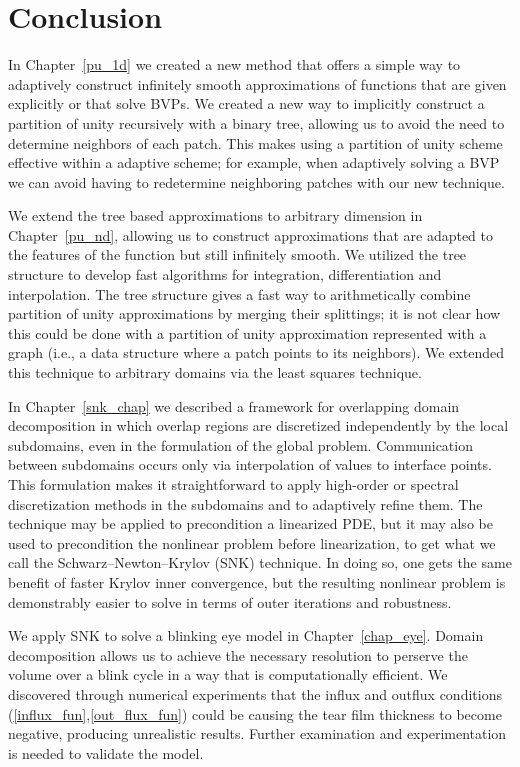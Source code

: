\chapter{Conclusion}

In Chapter~\ref{pu_1d} we created a new method that offers a simple way to adaptively construct infinitely smooth approximations of functions that are given explicitly or that solve BVPs. We created a new way to implicitly construct a partition of unity recursively with a binary tree, allowing us to avoid the need to determine neighbors of each patch. This makes using a partition of unity scheme effective within a adaptive scheme; for example, when adaptively solving a BVP we can avoid having to redetermine neighboring patches with  our new technique. 

We extend the tree based approximations to arbitrary dimension in Chapter~\ref{pu_nd}, allowing us to construct approximations that are adapted to the features of the function but still infinitely smooth. We utilized the tree structure to develop fast algorithms for integration, differentiation and interpolation. The tree structure gives a fast way to arithmetically combine partition of unity approximations by merging their splittings; it is not clear how this could be done with a partition of unity approximation represented with a graph (i.e., a data structure where a patch points to its neighbors). We extended this technique to arbitrary domains via the least squares technique. 

In Chapter~\ref{snk_chap} we described a framework for overlapping domain decomposition in which overlap regions are discretized independently by the local subdomains, even in the formulation of the global problem. Communication between subdomains occurs only via interpolation of values to interface points. This formulation makes it straightforward to apply high-order or spectral discretization methods in the subdomains and to adaptively refine them. The technique may be applied to precondition a linearized PDE, but it may also be used to precondition the nonlinear problem before linearization, to get what we call the Schwarz--Newton--Krylov (SNK) technique. In doing so, one gets the same benefit of faster Krylov inner convergence, but the resulting nonlinear problem is demonstrably easier to solve in terms of outer iterations and robustness. 

We apply SNK to solve a blinking eye model in Chapter~\ref{chap_eye}. Domain decomposition allows us to achieve the necessary resolution to perserve the volume over a blink cycle in a way that is computationally efficient. We discovered through numerical experiments that the influx and outflux conditions (\ref{influx_fun},\ref{out_flux_fun}) could be causing the tear film thickness to become negative, producing unrealistic results. Further examination and experimentation is needed to validate the model.

